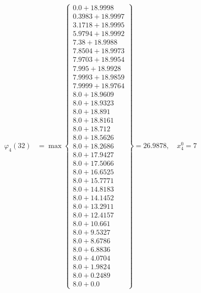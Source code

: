 \documentclass{article}
\begin{document}
\begin{align*}
  
\varphi_{4}(32) &= \max \left\{ \begin{array}{c}
0.0 + 18.9998 \\
 0.3983 + 18.9997 \\
 3.1718 + 18.9995 \\
 5.9794 + 18.9992 \\
 7.38 + 18.9988 \\
 7.8504 + 18.9973 \\
 7.9703 + 18.9954 \\
 7.995 + 18.9928 \\
 7.9993 + 18.9859 \\
 7.9999 + 18.9764 \\
 8.0 + 18.9609 \\
 8.0 + 18.9323 \\
 8.0 + 18.891 \\
 8.0 + 18.8161 \\
 8.0 + 18.712 \\
 8.0 + 18.5626 \\
 8.0 + 18.2686 \\
 8.0 + 17.9427 \\
 8.0 + 17.5066 \\
 8.0 + 16.6525 \\
 8.0 + 15.7771 \\
 8.0 + 14.8183 \\
 8.0 + 14.1452 \\
 8.0 + 13.2911 \\
 8.0 + 12.4157 \\
 8.0 + 10.661 \\
 8.0 + 9.5327 \\
 8.0 + 8.6786 \\
 8.0 + 6.8836 \\
 8.0 + 4.0704 \\
 8.0 + 1.9824 \\
 8.0 + 0.2489 \\
 8.0 + 0.0
\end{array} \right\}=26.9878,\quad x_{4}^0=7\\
  
  
  

\end{align*}
\end{document}
